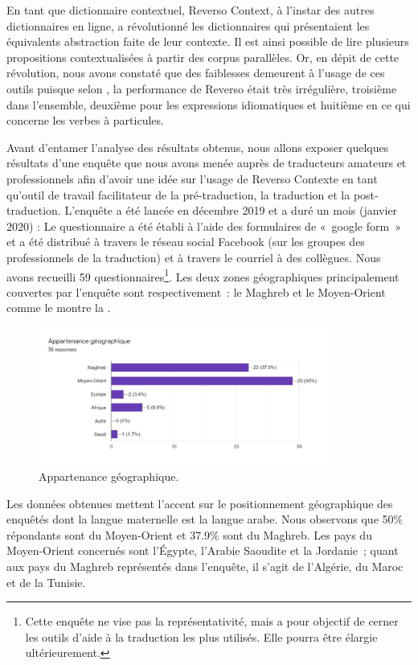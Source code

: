 \documentclass[french]{textolivre}
\begin{document}
En tant que dictionnaire contextuel, Reverso Context, à l’instar des autres dictionnaires en ligne, a révolutionné les dictionnaires qui présentaient les équivalents abstraction faite de leur contexte. Il est ainsi possible de lire plusieurs propositions contextualisées à partir des corpus parallèles. Or, en dépit de cette révolution, nous avons constaté que des faiblesses demeurent à l’usage de ces outils puisque selon \textcite[p. 16]{yen2013}, la performance de Reverso était très irrégulière, troisième dans l’ensemble, deuxième pour les expressions idiomatiques et huitième en ce qui concerne les verbes à particules.

Avant d’entamer l’analyse des résultats obtenus, nous allons exposer quelques résultats d’une enquête que nous avons menée auprès de traducteurs amateurs et professionnels afin d’avoir une idée sur l’usage de Reverso Contexte en tant qu’outil de travail facilitateur de la pré-traduction, la traduction et  la post-traduction. L’enquête a été lancée en décembre 2019 et a duré un mois (janvier 2020) :  Le questionnaire a été établi à l’aide des formulaires de « google form » et a été distribué à travers le réseau social Facebook (sur les groupes des professionnels de la traduction) et à travers le courriel à des collègues. Nous avons recueilli 59 questionnaires\footnote{
Cette enquête ne vise pas la représentativité, mais a pour objectif de cerner les outils d’aide à la traduction les plus utilisés. Elle pourra être élargie ultérieurement.
}. Les deux zones géographiques principalement couvertes par l’enquête sont respectivement : le Maghreb et le Moyen-Orient comme le montre la .

\begin{figure}[htbp]
 \centering
 \includegraphics[width=0.85\textwidth]{figure01.pdf}
 \caption{Appartenance géographique.}
 \label{fig-01}
\end{figure}

Les données obtenues mettent l’accent sur le positionnement géographique des enquêtés dont la langue maternelle est la langue arabe. Nous observons que 50\% répondants sont du Moyen-Orient et 37.9\% sont du Maghreb. Les pays du Moyen-Orient concernés sont l’Égypte, l’Arabie Saoudite et la Jordanie ; quant aux pays du Maghreb représentés dans l’enquête, il s’agit de l’Algérie, du Maroc et de la Tunisie.
\end{document}
